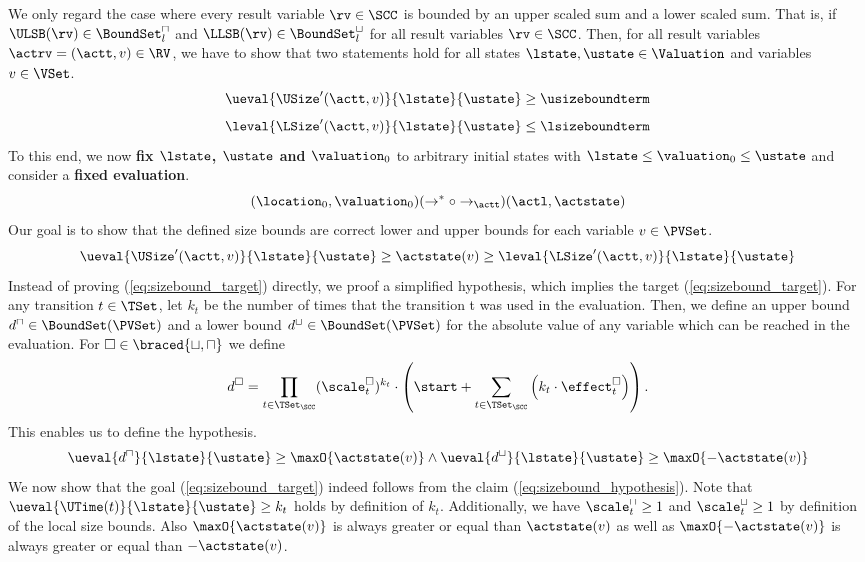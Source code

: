 We only regard the case where every result variable $\rv \in \SCC$ is bounded by an upper scaled sum and a lower scaled sum.
That is, if $\ULSB(\rv) \in \BoundSet^\sqcap_l$ and $\LLSB(\rv) \in \BoundSet^\sqcup_l$ for all result variables $\rv \in \SCC$.
Then, for all result variables $\actrv = (\actt, v) \in \RV$, we have to show that two statements hold for all states $\lstate, \ustate \in \Valuation$ and variables $v \in \VSet$.
\[ \ueval{\USize'(\actt, v)}{\lstate}{\ustate} \geq \usizeboundterm \]
\[ \leval{\LSize'(\actt, v)}{\lstate}{\ustate} \leq \lsizeboundterm \]
To this end, we now \textbf{fix $\lstate$, $\ustate$ and $\valuation_0$} to arbitrary initial states with $\lstate \leq \valuation_0 \leq \ustate$ and consider a \textbf{fixed evaluation}.
\[ (\location_0, \valuation_0) (\rightarrow^* \circ \rightarrow_\actt) (\actl, \actstate) \]
Our goal is to show that the defined size bounds are correct lower and upper bounds for each variable $v \in \PVSet$.
\begin{equation} \label{eq:sizebound_target}
  \ueval{\USize'(\actt, v)}{\lstate}{\ustate} \geq \actstate(v) \geq \leval{\LSize'(\actt, v)}{\lstate}{\ustate}
\end{equation}
Instead of proving (\ref{eq:sizebound_target}) directly, we proof a simplified hypothesis, which implies the target (\ref{eq:sizebound_target}).
For any transition $t \in \TSet$, let $k_t$ be the number of times that the transition t was used in the evaluation.
Then, we define an upper bound $d^\sqcap \in \BoundSet(\PVSet)$ and a lower bound $d^\sqcup \in \BoundSet(\PVSet)$ for the absolute value of any variable which can be reached in the evaluation.
For $\square \in \braced{\sqcup, \sqcap}$ we define
\[ d^\square = \prod_{t \in \TSet_\SCC} (\scale^\square_t)^{k_t} \cdot \left( \start + \sum_{t \in \TSet_\SCC} \left( k_t \cdot \effect^\square_t \right) \right). \]
This enables us to define the hypothesis.
\begin{equation} \label{eq:sizebound_hypothesis}
  \ueval{d^\sqcap}{\lstate}{\ustate} \geq \maxO{\actstate(v)} \wedge \ueval{d^\sqcup}{\lstate}{\ustate} \geq \maxO{-\actstate(v)}
\end{equation}
We now show that the goal (\ref{eq:sizebound_target}) indeed follows from the claim (\ref{eq:sizebound_hypothesis}).
Note that $\ueval{\UTime(t)}{\lstate}{\ustate} \geq k_t$ holds by definition of $k_t$.
Additionally, we have $\scale^\sqcap_t \geq 1$ and $\scale^\sqcup_t \geq 1$ by definition of the local size bounds.
Also $\maxO{\actstate(v)}$ is always greater or equal than $\actstate(v)$ as well as $\maxO{-\actstate(v)}$ is always greater or equal than $-\actstate(v)$.
